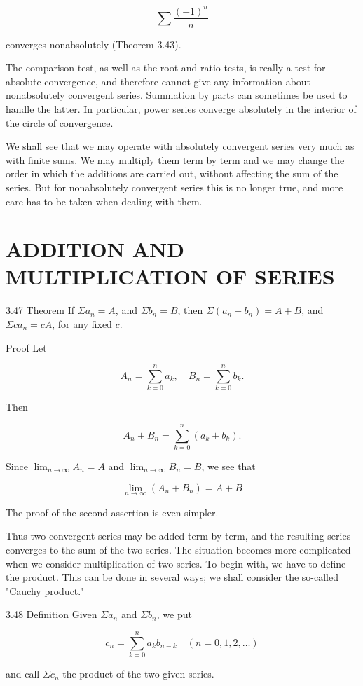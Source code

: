 \documentclass[10pt]{article}
\begin{document}
$$
\sum \frac{(-1)^{n}}{n}
$$

converges nonabsolutely (Theorem 3.43).

The comparison test, as well as the root and ratio tests, is really a test for absolute convergence, and therefore cannot give any information about nonabsolutely convergent series. Summation by parts can sometimes be used to handle the latter. In particular, power series converge absolutely in the interior of the circle of convergence.

We shall see that we may operate with absolutely convergent series very much as with finite sums. We may multiply them term by term and we may change the order in which the additions are carried out, without affecting the sum of the series. But for nonabsolutely convergent series this is no longer true, and more care has to be taken when dealing with them.

\section{ADDITION AND MULTIPLICATION OF SERIES}
3.47 Theorem If $\Sigma a_{n}=A$, and $\Sigma b_{n}=B$, then $\Sigma\left(a_{n}+b_{n}\right)=A+B$, and $\Sigma c a_{n}=c A$, for any fixed $c$.

Proof Let

$$
A_{n}=\sum_{k=0}^{n} a_{k}, \quad B_{n}=\sum_{k=0}^{n} b_{k} .
$$

Then

$$
A_{n}+B_{n}=\sum_{k=0}^{n}\left(a_{k}+b_{k}\right) .
$$

Since $\lim _{n \rightarrow \infty} A_{n}=A$ and $\lim _{n \rightarrow \infty} B_{n}=B$, we see that

$$
\lim _{n \rightarrow \infty}\left(A_{n}+B_{n}\right)=A+B
$$

The proof of the second assertion is even simpler.

Thus two convergent series may be added term by term, and the resulting series converges to the sum of the two series. The situation becomes more complicated when we consider multiplication of two series. To begin with, we have to define the product. This can be done in several ways; we shall consider the so-called "Cauchy product."

3.48 Definition Given $\Sigma a_{n}$ and $\Sigma b_{n}$, we put

$$
c_{n}=\sum_{k=0}^{n} a_{k} b_{n-k} \quad(n=0,1,2, \ldots)
$$

and call $\Sigma c_{n}$ the product of the two given series.
\end{document}
